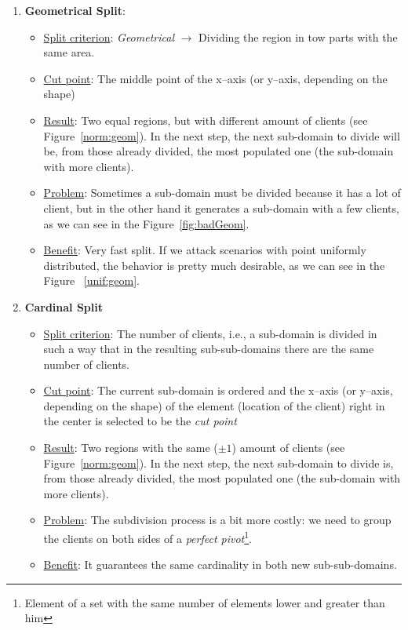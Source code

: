 \begin{enumerate}
\item {\bf Geometrical Split}: 
\begin{itemize}
\item \underline{Split criterion}: {\it Geometrical} $\rightarrow$ Dividing the region in tow parts with the same area.
\item \underline{Cut point}: The middle point of the x--axis (or y--axis, depending on the shape)
\item \underline{Result}: Two equal regions, but with different amount of clients (see Figure~\ref{norm:geom}). In the next step, the next sub-domain to divide will be, from those already divided, the most populated one (the sub-domain with more clients).
\item \underline{Problem}: Sometimes a sub-domain must be divided because it has a lot of client, but in the other hand it generates a sub-domain with a few clients, as we can see in the Figure~\ref{fig:badGeom}.
\item \underline{Benefit}: Very fast split. If we attack scenarios with point uniformly distributed, the behavior is pretty much desirable, as we can see in the Figure ~\ref{unif:geom}. 
\end{itemize}

\item {\bf Cardinal Split}
\begin{itemize}
\item \underline{Split criterion}: The number of clients, i.e., a sub-domain is divided in such a way that in the resulting sub-sub-domains there are the same number of clients.
\item \underline{Cut point}: The current sub-domain is ordered and the x--axis (or y--axis, depending on the shape) of the element (location of the client) right in the center is selected to be the {\it cut point}
\item \underline{Result}: Two regions with the same ($\pm 1$) amount of clients (see Figure~\ref{norm:geom}). In the next step, the next sub-domain to divide is, from those already divided, the most populated one (the sub-domain with more clients).
\item \underline{Problem}: The subdivision process is a bit more costly: we need to group the clients on both sides of a {\it perfect pivot}\footnote{Element of a set with the same number of elements lower and greater than him}.
\item \underline{Benefit}: It guarantees the same cardinality in both new sub-sub-domains.
\end{itemize}


\end{enumerate}
